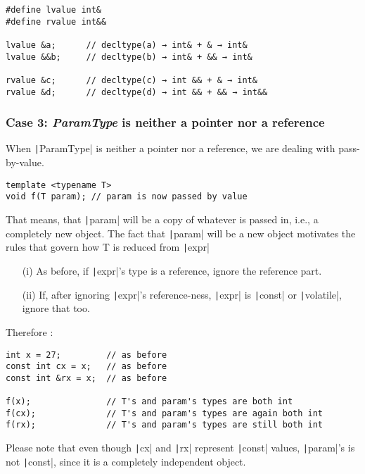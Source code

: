 \begin{verbatim}
#define lvalue int&
#define rvalue int&&

lvalue &a;      // decltype(a) → int& + & → int&
lvalue &&b;     // decltype(b) → int& + && → int&

rvalue &c;      // decltype(c) → int && + & → int&
rvalue &d;      // decltype(d) → int && + && → int&&
\end{verbatim}

\subsubsection*{Case 3: \textit{ParamType} is neither a pointer nor a reference}

When \texttt|ParamType| is neither a pointer nor a reference, we are dealing with pass-by-value.

\begin{verbatim}
template <typename T>
void f(T param); // param is now passed by value
\end{verbatim}

That means, that \texttt|param| will be a copy of whatever is passed in, i.e., a completely new object.
The fact that \texttt|param| will be a new object motivates the rules that govern how T is reduced from \texttt|expr|

\begin{itemize}
    \item[(i)] As before, if \texttt|expr|'s type is a reference, ignore the reference part.
    \item[(ii)] If, after ignoring \texttt|expr|'s reference-ness, \texttt|expr| is \texttt|const| or \texttt|volatile|, ignore that too.
\end{itemize}

Therefore :
\begin{verbatim}
int x = 27;         // as before
const int cx = x;   // as before
const int &rx = x;  // as before

f(x);               // T's and param's types are both int
f(cx);              // T's and param's types are again both int
f(rx);              // T's and param's types are still both int
\end{verbatim}

Please note that even though \texttt|cx| and \texttt|rx| represent \texttt|const| values, \texttt|param|'s is not \texttt|const|, since it is a completely independent object.
